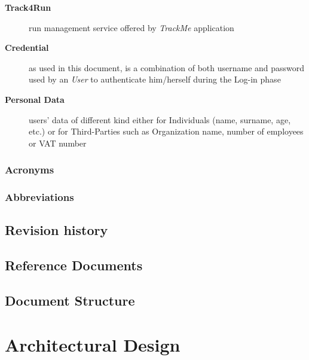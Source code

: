 \documentclass[a4paper]{article}
\begin{document}
\begin{description}
                    \item[\textbf{Track4Run}] run management service offered by \textit{TrackMe} application
                    
                    \item[\textbf{Credential}] as used in this document, is a combination of both username and password used by an \textit{User} to authenticate him/herself during the Log-in phase
                    
                    \item[\textbf{Personal Data}] users' data of different kind either for Individuals (name, surname, age, etc.) or for Third-Parties such as Organization name, number of employees or VAT number
                \end{description}
                
            
            \subsubsection{Acronyms}
            \begin{acronym}
            \end{acronym}
            
            \subsubsection{Abbreviations}



\subsection{Revision history}

\subsection{Reference Documents}

\subsection{Document Structure}

\section{Architectural Design}
\end{document}
